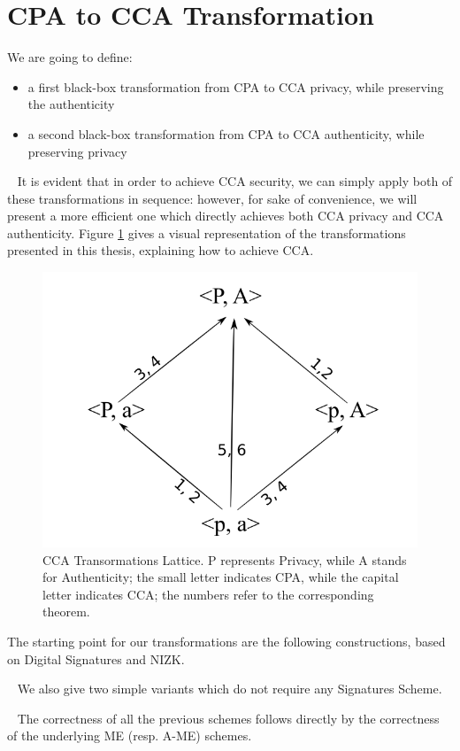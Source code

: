 \section{CPA to CCA Transformation}\label{sec:cca-transformation}
We are going to define:
\begin{itemize}
    \item a first black-box transformation from CPA to CCA privacy, while preserving the authenticity
    \item a second black-box transformation from CPA to CCA authenticity, while preserving privacy
\end{itemize}
~\newline
It is evident that in order to achieve CCA security, we can simply apply both of these transformations in sequence: however, for sake of convenience, we will present a more efficient one which directly achieves both CCA privacy and CCA authenticity.
Figure \ref{fig:constr} gives a visual representation of the transformations presented in this thesis, explaining how to achieve CCA.
\begin{figure}[ht]
    \centering
    \includegraphics[width=0.7\linewidth]{images/constr.png}
    \caption{CCA Transormations Lattice. P represents Privacy, while A stands for Authenticity; the small letter indicates CPA, while the capital letter indicates CCA; the numbers refer to the corresponding theorem.}
    \label{fig:constr}
\end{figure}
\newline\newline
The starting point for our transformations are the following constructions, based on Digital Signatures and NIZK.


~\newline
We also give two simple variants which do not require any Signatures Scheme.


~\newline
The correctness of all the previous schemes follows directly by the correctness of the underlying ME (resp. A-ME) schemes.

